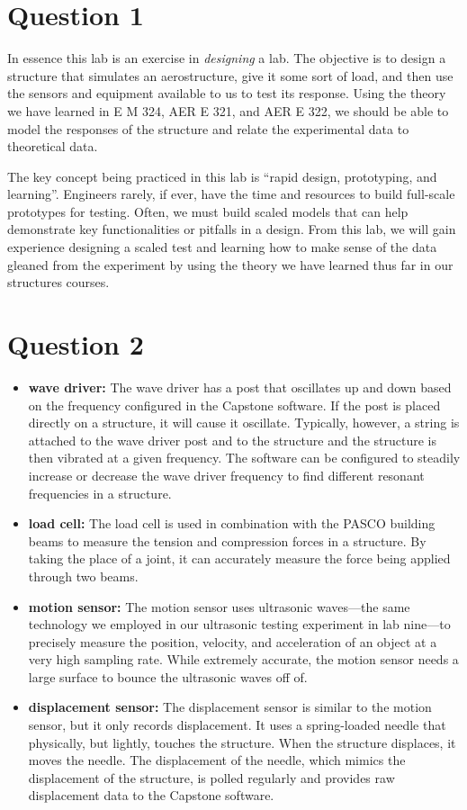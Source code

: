 \documentclass[12 pt]{article}
\begin{document}
\section*{Question 1}
In essence this lab is an exercise in \textit{designing} a lab. The objective is to design a structure that simulates an aerostructure, give it some sort of load, and then use the sensors and equipment available to us to test its response. Using the theory we have learned in E M \num{324}, AER E \num{321}, and AER E \num{322}, we should be able to model the responses of the structure and relate the experimental data to theoretical data.

The key concept being practiced in this lab is ``rapid design, prototyping, and learning''. Engineers rarely, if ever, have the time and resources to build full-scale prototypes for testing. Often, we must build scaled models that can help demonstrate key functionalities or pitfalls in a design. From this lab, we will gain experience designing a scaled test and learning how to make sense of the data gleaned from the experiment by using the theory we have learned thus far in our structures courses.

\section*{Question 2}
\begin{itemize}
	\item \textbf{wave driver:} The wave driver has a post that oscillates up and down based on the frequency configured in the Capstone software. If the post is placed directly on a structure, it will cause it oscillate. Typically, however, a string is attached to the wave driver post and to the structure and the structure is then vibrated at a given frequency. The software can be configured to steadily increase or decrease the wave driver frequency to find different resonant frequencies in a structure.
	\item \textbf{load cell:} The load cell is used in combination with the PASCO building beams to measure the tension and compression forces in a structure. By taking the place of a joint, it can accurately measure the force being applied through two beams.
	\item \textbf{motion sensor:} The motion sensor uses ultrasonic waves---the same technology we employed in our ultrasonic testing experiment in lab nine---to precisely measure the position, velocity, and acceleration of an object at a very high sampling rate. While extremely accurate, the motion sensor needs a large surface to bounce the ultrasonic waves off of.
	\item \textbf{displacement sensor:} The displacement sensor is similar to the motion sensor, but it only records displacement. It uses a spring-loaded needle that physically, but lightly, touches the structure. When the structure displaces, it moves the needle. The displacement of the needle, which mimics the displacement of the structure, is polled regularly and provides raw displacement data to the Capstone software.
\end{itemize}
\end{document}
